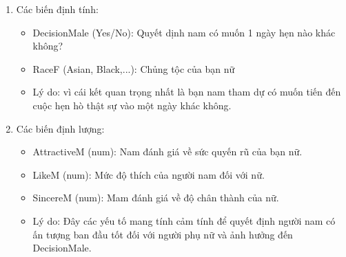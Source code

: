 \documentclass[a4paper,12pt]{article}
\begin{document}
		\begin{enumerate}[label = {\alph*)}]
			\item Các biến định tính:\\
			\begin{itemize}
				\item DecisionMale (Yes/No): Quyết dịnh nam có muốn 1 ngày hẹn nào khác không?
				\item RaceF (Asian, Black,...): Chủng tộc của bạn nữ
				\item[\textrightarrow] Lý do: vì cái kết quan trọng nhất là bạn nam tham dự có muốn tiến đến cuộc hẹn hò 
				thật sự vào một ngày khác không.
			\end{itemize}
			
			
			\item Các biến định lượng:\\
			\begin{itemize}
				\item AttractiveM (num): Nam đánh giá về sức quyến rũ của bạn nữ.
				\item LikeM (num): Mức độ thích của người nam đối với nữ.
				\item SincereM (num): Mam đánh giá về độ chân thành của nữ.
				\item[\textrightarrow] Lý do: Đây các yếu tố mang tính cảm tính để quyết định người nam có ấn tượng ban đầu tốt đối với người phụ nữ và ảnh hưởng đến DecisionMale.
			\end{itemize}
		\end{enumerate}
	
\end{document}
